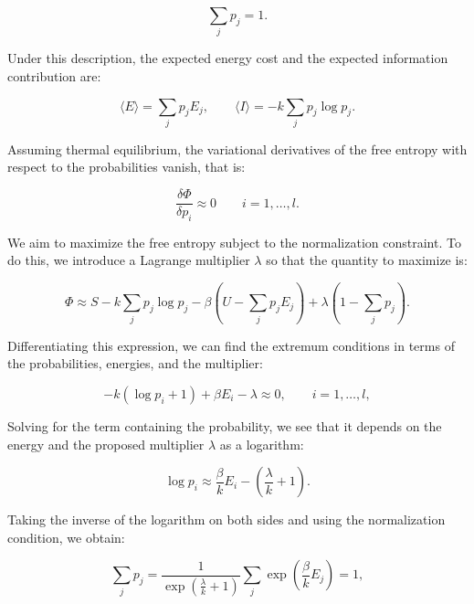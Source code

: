 \documentclass[12pt]{article}
\begin{document}
\begin{equation}
\sum_j p_j = 1.
\end{equation}

Under this description, the expected energy cost and the expected information contribution are:

\begin{equation}
\langle E \rangle = \sum_j p_j E_j, \qquad  
\langle I \rangle = -k \sum_j p_j \log p_j.
\end{equation}

Assuming thermal equilibrium, the variational derivatives of the free entropy with respect to the probabilities vanish, that is:

\begin{equation}
\frac{\delta \Phi}{\delta p_i} \approx 0 \qquad i = 1, \dots, l  .
\end{equation}

We aim to maximize the free entropy subject to the normalization constraint. To do this, we introduce a Lagrange multiplier $\lambda$ so that the quantity to maximize is:

\begin{equation}
\Phi \approx S - k \sum_j p_j \log p_j - \beta \left(U - \sum_j p_j E_j \right) + \lambda \left(1 - \sum_j p_j \right).
\end{equation}

Differentiating this expression, we can find the extremum conditions in terms of the probabilities, energies, and the multiplier:

\begin{equation}
-k (\log p_i + 1) + \beta E_i - \lambda \approx 0, \qquad i = 1, \dots, l,
\end{equation}

Solving for the term containing the probability, we see that it depends on the energy and the proposed multiplier $\lambda$ as a logarithm:

\begin{equation}
\log p_i \approx \frac{\beta}{k} E_i - \left(\frac{\lambda}{k} + 1\right)  .
\end{equation}

Taking the inverse of the logarithm on both sides and using the normalization condition, we obtain:

\begin{equation}
\sum_j p_j = \frac{1}{\exp(\frac{\lambda}{k} + 1)} \sum_j \exp\left(\frac{\beta}{k} E_j\right) = 1,
\end{equation}
\end{document}
